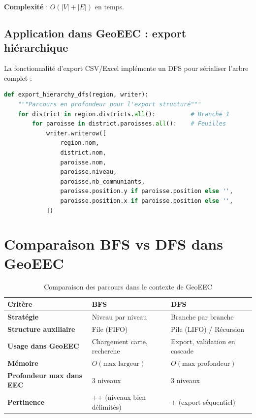\documentclass[12pt, a4paper]{report}
\theoremstyle{definition}
\begin{document}
\textbf{Complexité} : $O(|V| + |E|)$ en temps.

\subsection{Application dans GeoEEC : export hiérarchique}

La fonctionnalité d'export CSV/Excel implémente un DFS pour sérialiser l'arbre complet :

\begin{lstlisting}[language=Python, caption=Export DFS de la hiérarchie EEC]
def export_hierarchy_dfs(region, writer):
    """Parcours en profondeur pour l'export structuré"""
    for district in region.districts.all():          # Branche 1
        for paroisse in district.paroisses.all():    # Feuilles
            writer.writerow([
                region.nom,
                district.nom,
                paroisse.nom,
                paroisse.niveau,
                paroisse.nb_communiants,
                paroisse.position.y if paroisse.position else '',
                paroisse.position.x if paroisse.position else '',
            ])
\end{lstlisting}

\section{Comparaison BFS vs DFS dans GeoEEC}

\begin{table}[H]
\centering
\caption{Comparaison des parcours dans le contexte de GeoEEC}
\begin{tabularx}{\textwidth}{>{\bfseries}l X X}
\toprule
Critère & BFS & DFS \\
\midrule
Stratégie & Niveau par niveau & Branche par branche \\
Structure auxiliaire & File (FIFO) & Pile (LIFO) / Récursion \\
Usage dans GeoEEC & Chargement carte, recherche & Export, validation en cascade \\
Mémoire & $O(\text{max largeur})$ & $O(\text{max profondeur})$ \\
Profondeur max dans EEC & 3 niveaux & 3 niveaux \\
Pertinence & ++ (niveaux bien délimités) & + (export séquentiel) \\
\bottomrule
\end{tabularx}
\end{table}

\end{document}
